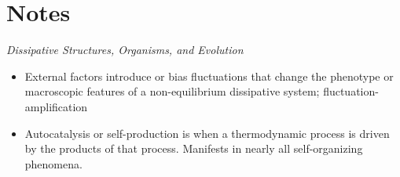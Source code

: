 \documentclass[12pt,letterpaper]{article}
\newcommand{\mb}{\mathbf}
\begin{document}

\section{Notes}

\textit{Dissipative Structures, Organisms, and Evolution}
\begin{itemize}
\item External factors introduce or bias fluctuations that change the phenotype or macroscopic features of a non-equilibrium dissipative system; fluctuation-amplification
\item Autocatalysis or self-production is when a thermodynamic process is driven by the products of that process. Manifests in nearly all self-organizing phenomena.
\end{itemize}
\end{document}
